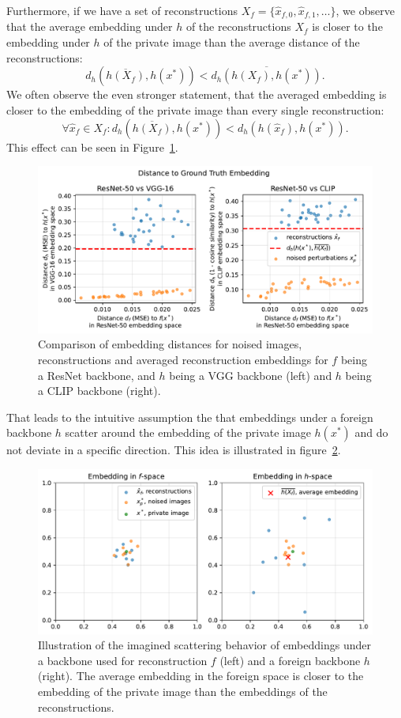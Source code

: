 \documentclass[10pt,twocolumn]{article}
\begin{document}
Furthermore, if we have a set of reconstructions $X_f = \{\hat x_{f,0}, \hat x_{f,1}, \dots\}$, we observe that the average embedding under $h$ of the reconstructions $X_f$ is closer to the embedding under $h$ of the private image than the average distance of the reconstructions:
$$d_h\left(\overline{h(X_f)}, h(x^*)\right) < \overline{d_h(h(X_f), h(x^*))}.$$
We often observe the even stronger statement, that the averaged embedding is closer to the embedding of the private image than every single reconstruction:
$$\forall\hat x_f \in X_f: d_h\left(\overline{h(X_f)}, h(x^*)\right) < d_h(h(\hat x_f), h(x^*)).$$
This effect can be seen in Figure~\ref{fig:avg_distance_scatter}.
\begin{figure}[ht]
    \centering
    \includegraphics[width=\linewidth]{figures/avg-distance-scatter}
    \caption{
       Comparison of embedding distances for noised images, reconstructions and averaged reconstruction embeddings for $f$ being a ResNet backbone, and $h$ being a VGG backbone (left) and $h$ being a CLIP backbone (right).
    }
    \label{fig:avg_distance_scatter}
\end{figure}

That leads to the intuitive assumption the that embeddings under a foreign backbone $h$ scatter around the embedding of the private image $h(x^*)$ and do not deviate in a specific direction.
This idea is illustrated in figure~\ref{fig:avg_embedding_sketch}.
\begin{figure}[ht]
    \centering
    \includegraphics[width=\linewidth]{figures/avg-embedding-sketch}
    \caption{
       Illustration of the imagined scattering behavior of embeddings under a backbone used for reconstruction $f$ (left) and a foreign backbone $h$ (right).
       The average embedding in the foreign space is closer to the embedding of the private image than the embeddings of the reconstructions.
    }
    \label{fig:avg_embedding_sketch}
\end{figure}
\end{document}
